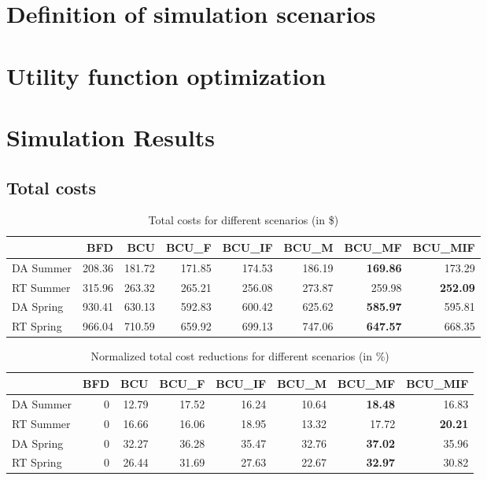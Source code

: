 

\section{Definition of simulation scenarios}


\section{Utility function optimization}


\section{Simulation Results}







\subsection{Total costs}


\begin{table}[ht]
\centering

\begin{tabular}{lrrrrrrr}
\toprule
{} &     BFD &     BCU &   BCU\_F &  BCU\_IF &   BCU\_M &  BCU\_MF &  BCU\_MIF \\
\midrule
DA Summer &  208.36 &  181.72 &  171.85 &  174.53 &  186.19 &  \textbf{169.86} &   173.29 \\
RT Summer &  315.96 &  263.32 &  265.21 &  256.08 &  273.87 &  259.98 &   \textbf{252.09} \\
DA Spring &  930.41 &  630.13 &  592.83 &  600.42 &  625.62 &  \textbf{585.97} &   595.81 \\
RT Spring &  966.04 &  710.59 &  659.92 &  699.13 &  747.06 &  \textbf{647.57} &   668.35 \\
\bottomrule
\end{tabular}
\caption{Total costs for different scenarios (in \$)}
\end{table}

\begin{table}[ht]
\centering
\begin{tabular}{lrrrrrrr}
\toprule
{} &  BFD &    BCU &  BCU\_F &  BCU\_IF &  BCU\_M &  BCU\_MF &  BCU\_MIF \\
\midrule
DA Summer &    0 &  12.79 &  17.52 &   16.24 &  10.64 &   \textbf{18.48} &    16.83 \\
RT Summer &    0 &  16.66 &  16.06 &   18.95 &  13.32 &   17.72 &    \textbf{20.21} \\
DA Spring &    0 &  32.27 &  36.28 &   35.47 &  32.76 &   \textbf{37.02} &    35.96 \\
RT Spring &    0 &  26.44 &  31.69 &   27.63 &  22.67 &   \textbf{32.97} &    30.82 \\
\bottomrule
\end{tabular}
\caption{Normalized total cost reductions for different scenarios (in \%)}
\end{table}





